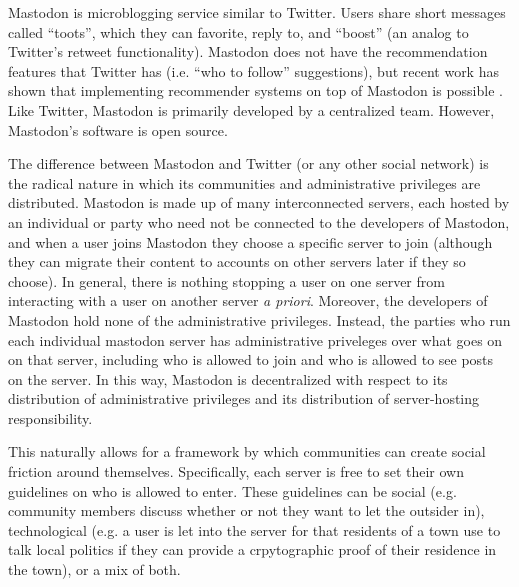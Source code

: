 \documentclass[sigconf,authordraft]{acmart}
\begin{document}
Mastodon is microblogging service similar to Twitter. Users share short messages called ``toots'', which they can favorite, reply to, and ``boost'' (an analog to Twitter's retweet functionality). Mastodon does not have the recommendation features that Twitter has (i.e. ``who to follow'' suggestions), but recent work has shown that implementing recommender systems on top of Mastodon is possible \cite{trienes2018recommending}. Like Twitter, Mastodon is primarily developed by a centralized team. However, Mastodon's software is open source.

The difference between Mastodon and Twitter (or any other social network) is the radical nature in which its communities and administrative privileges are distributed. Mastodon is made up of many interconnected servers, each hosted by an individual or party who need not be connected to the developers of Mastodon, and when a user joins Mastodon they choose a specific server to join (although they can migrate their content to accounts on other servers later if they so choose). In general, there is nothing stopping a user on one server from interacting with a user on another server {\itshape a priori}. Moreover, the developers of Mastodon hold none of the administrative privileges. Instead, the parties who run each individual mastodon server has administrative priveleges over what goes on on that server, including who is allowed to join and who is allowed to see posts on the server. In this way, Mastodon is decentralized with respect to its distribution of administrative privileges and its distribution of server-hosting responsibility.

This naturally allows for a framework by which communities can create social friction around themselves. Specifically, each server is free to set their own guidelines on who is allowed to enter. These guidelines can be social (e.g. community members discuss whether or not they want to let the outsider in), technological (e.g. a user is let into the server for that residents of a town use to talk local politics if they can provide a crpytographic proof of their residence in the town), or a mix of both. 
\end{document}
